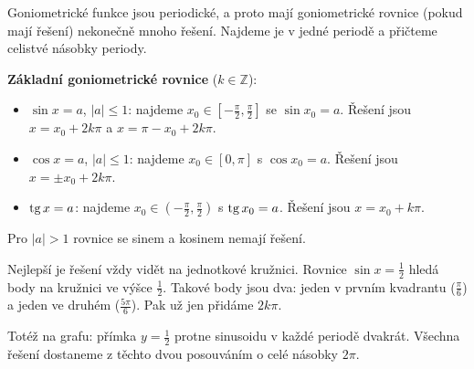 Goniometrické funkce jsou periodické, a proto mají goniometrické rovnice (pokud mají řešení) nekonečně mnoho řešení. Najdeme je v jedné periodě a přičteme celistvé násobky periody.

\begin{definitionbox}
  \textbf{Základní goniometrické rovnice} ($k\in\mathbb{Z}$):
  \begin{itemize}
    \item $\sin x = a$, $|a|\leq 1$: najdeme $x_0\in\left[-\frac{\pi}{2}, \frac{\pi}{2}\right]$ se $\sin x_0 = a$. Řešení jsou $x = x_0 + 2k\pi$ a $x = \pi - x_0 + 2k\pi$.
    \item $\cos x = a$, $|a|\leq 1$: najdeme $x_0\in[0, \pi]$ s $\cos x_0 = a$. Řešení jsou $x = \pm x_0 + 2k\pi$.
    \item $\operatorname{tg} x = a$: najdeme $x_0\in\left(-\frac{\pi}{2}, \frac{\pi}{2}\right)$ s $\operatorname{tg} x_0 = a$. Řešení jsou $x = x_0 + k\pi$.
  \end{itemize}
  Pro $|a| > 1$ rovnice se sinem a kosinem nemají řešení.
\end{definitionbox}

Nejlepší je řešení vždy vidět na jednotkové kružnici. Rovnice $\sin x = \frac{1}{2}$ hledá body na kružnici ve výšce $\frac{1}{2}$. Takové body jsou dva: jeden v prvním kvadrantu ($\frac{\pi}{6}$) a jeden ve druhém ($\frac{5\pi}{6}$). Pak už jen přidáme $2k\pi$.

\begin{center}
\end{center}

Totéž na grafu: přímka $y = \frac{1}{2}$ protne sinusoidu v každé periodě dvakrát. Všechna řešení dostaneme z těchto dvou posouváním o celé násobky $2\pi$.

